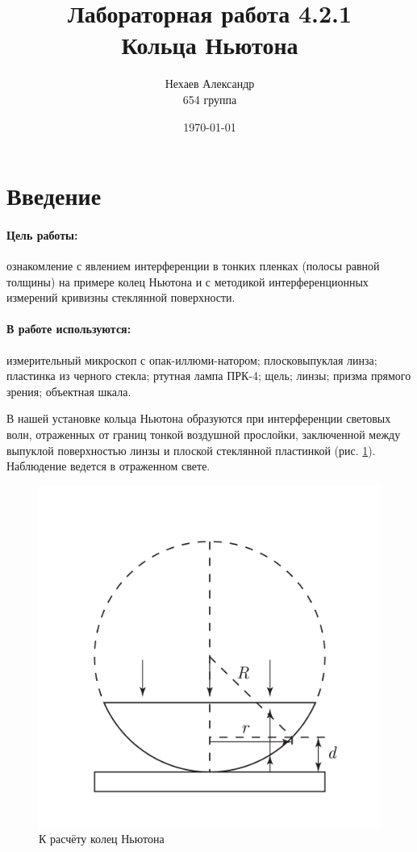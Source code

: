 \documentclass[a4paper, 12pt]{article}
\title{Лабораторная работа 4.2.1\\Кольца Ньютона}
\author{Нехаев Александр\\654 группа}
\date{\today}
\begin{document}
	\maketitle
	\newpage
	\tableofcontents
	\newpage
	\section{Введение}
	\paragraph{Цель работы:} ознакомление с явлением интерференции в тонких пленках (полосы равной толщины) на примере колец Ньютона и с методикой интерференционных измерений кривизны стеклянной поверхности.
	\paragraph{В работе используются:} измерительный микроскоп с опак-иллюми-натором; плосковыпуклая линза; пластинка из черного стекла; ртутная лампа ПРК-4; щель; линзы; призма прямого зрения; объектная шкала.\par
	В нашей установке кольца Ньютона образуются при интерференции световых волн, отраженных от границ тонкой воздушной прослойки, заключенной между выпуклой поверхностью линзы и плоской стеклянной пластинкой (рис. \ref{calc_scheme}). Наблюдение ведется в отраженном свете.\par
	\begin{figure}
		\includegraphics[scale=0.2]{Newton_Rings.pdf}
		\caption{К расчёту колец Ньютона}
		\label{calc_scheme}
	\end{figure}
\end{document}
